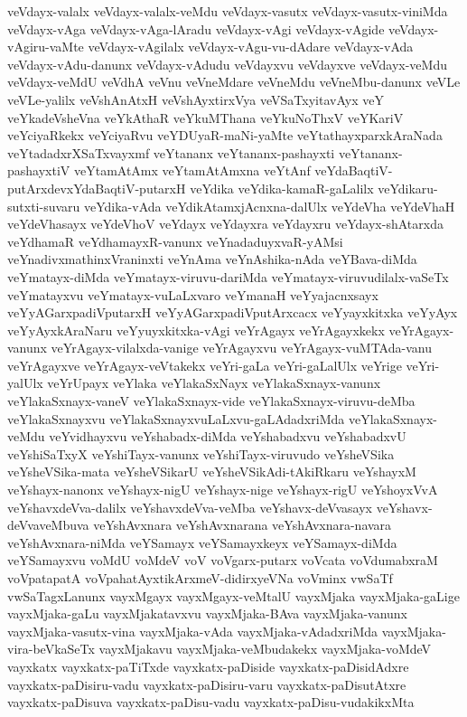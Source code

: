 {veVdayx-valalx
veVdayx-valalx-veMdu
veVdayx-vasutx
veVdayx-vasutx-viniMda
veVdayx-vAga
veVdayx-vAga-lAradu
veVdayx-vAgi
veVdayx-vAgide
veVdayx-vAgiru-vaMte
veVdayx-vAgilalx
veVdayx-vAgu-vu-dAdare
veVdayx-vAda
veVdayx-vAdu-danunx
veVdayx-vAdudu
veVdayxvu
veVdayxve
veVdayx-veMdu
veVdayx-veMdU
veVdhA
veVnu
veVneMdare
veVneMdu
veVneMbu-danunx
veVLe
veVLe-yalilx
veVshAnAtxH
veVshAyxtirxVya
veVSaTxyitavAyx
veY
veYkadeVsheVna
veYkAthaR
veYkuMThana
veYkuNoThxV
veYKariV
veYciyaRkekx
veYciyaRvu
veYDUyaR-maNi-yaMte
veYtathayxparxkAraNada
veYtadadxrXSaTxvayxmf
veYtananx
veYtananx-pashayxti
veYtananx-pashayxtiV
veYtamAtAmx
veYtamAtAmxna
veYtAnf
veYdaBaqtiV-putArxdevxYdaBaqtiV-putarxH
veYdika
veYdika-kamaR-gaLalilx
veYdikaru-sutxti-suvaru
veYdika-vAda
veYdikAtamxjAcnxna-dalUlx
veYdeVha
veYdeVhaH
veYdeVhasayx
veYdeVhoV
veYdayx
veYdayxra
veYdayxru
veYdayx-shAtarxda
veYdhamaR
veYdhamayxR-vanunx
veYnadaduyxvaR-yAMsi
veYnadivxmathinxVraninxti
veYnAma
veYnAshika-nAda
veYBava-diMda
veYmatayx-diMda
veYmatayx-viruvu-dariMda
veYmatayx-viruvudilalx-vaSeTx
veYmatayxvu
veYmatayx-vuLaLxvaro
veYmanaH
veYyajacnxsayx
veYyAGarxpadiVputarxH
veYyAGarxpadiVputArxcacx
veYyayxkitxka
veYyAyx
veYyAyxkAraNaru
veYyuyxkitxka-vAgi
veYrAgayx
veYrAgayxkekx
veYrAgayx-vanunx
veYrAgayx-vilalxda-vanige
veYrAgayxvu
veYrAgayx-vuMTAda-vanu
veYrAgayxve
veYrAgayx-veVtakekx
veYri-gaLa
veYri-gaLalUlx
veYrige
veYri-yalUlx
veYrUpayx
veYlaka
veYlakaSxNayx
veYlakaSxnayx-vanunx
veYlakaSxnayx-vaneV
veYlakaSxnayx-vide
veYlakaSxnayx-viruvu-deMba
veYlakaSxnayxvu
veYlakaSxnayxvuLaLxvu-gaLAdadxriMda
veYlakaSxnayx-veMdu
veYvidhayxvu
veYshabadx-diMda
veYshabadxvu
veYshabadxvU
veYshiSaTxyX
veYshiTayx-vanunx
veYshiTayx-viruvudo
veYsheVSika
veYsheVSika-mata
veYsheVSikarU
veYsheVSikAdi-tAkiRkaru
veYshayxM
veYshayx-nanonx
veYshayx-nigU
veYshayx-nige
veYshayx-rigU
veYshoyxVvA
veYshavxdeVva-dalilx
veYshavxdeVva-veMba
veYshavx-deVvasayx
veYshavx-deVvaveMbuva
veYshAvxnara
veYshAvxnarana
veYshAvxnara-navara
veYshAvxnara-niMda
veYSamayx
veYSamayxkeyx
veYSamayx-diMda
veYSamayxvu
voMdU
voMdeV
voV
voVgarx-putarx
voVcata
voVdumabxraM
voVpatapatA
voVpahatAyxtikArxmeV-didirxyeVNa
voVminx
vwSaTf
vwSaTagxLanunx
vayxMgayx
vayxMgayx-veMtalU
vayxMjaka
vayxMjaka-gaLige
vayxMjaka-gaLu
vayxMjakatavxvu
vayxMjaka-BAva
vayxMjaka-vanunx
vayxMjaka-vasutx-vina
vayxMjaka-vAda
vayxMjaka-vAdadxriMda
vayxMjaka-vira-beVkaSeTx
vayxMjakavu
vayxMjaka-veMbudakekx
vayxMjaka-voMdeV
vayxkatx
vayxkatx-paTiTxde
vayxkatx-paDiside
vayxkatx-paDisidAdxre
vayxkatx-paDisiru-vadu
vayxkatx-paDisiru-varu
vayxkatx-paDisutAtxre
vayxkatx-paDisuva
vayxkatx-paDisu-vadu
vayxkatx-paDisu-vudakikxMta
}
